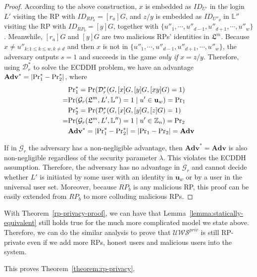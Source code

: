 \begin{proof}
  According to the above construction, %
  $x$ is embedded as $ID_{U'}$ in the login $L'$ visiting the RP with $ID_{RP_{a}} = [r_{a}]G$,
  and $z/y$ is embedded as $ID_{U''_d}$ in $\mathbb{L}''$ visiting the RP with $ID_{RP_{b}}=[y]G$,
  together with $\{u''_1, \cdots, u''_{d-1}, u''_{d+1}, \cdots, u''_w\}$.
  Meanwhile, $[r_{a}]G$ and $[y]G$ are two malicious RPs' identities in $\mathfrak{L}^m$.
  Because $x \neq u''_{k; 1\leq k \leq w, k \neq d}$ and then $x$ is not in $\{u''_1, \cdots, u''_{d-1}, u''_{d+1}, \cdots, u''_w\}$, the adversary outputs $s=1$ and succeeds in the game \emph{only if} $x = z/y$.
  Therefore, using $\mathcal{D}^*_r$ to solve the ECDDH problem, we have an advantage $\mathbf{Adv}^*=|{\rm Pr}^*_1 - {\rm Pr}^*_2|$, where
  \begin{align*}
  &{\rm Pr}^*_1 =  {\rm Pr}(\mathcal{D}^*_r(G, [x]G, [y]G, [xy]G)=1) \\
  =&{\rm Pr}(\mathcal{G}_r(\mathfrak{L}^m, L', \mathbb{L}'')=1 \; | \; u' \in \mathbf{u}_w) = {\rm Pr}_1 \\
  &{\rm Pr}^*_2= {\rm Pr}(\mathcal{D}^*_r(G, [x]G, [y]G, [z]G)=1) \\
  =&{\rm Pr}(\mathcal{G}_r(\mathfrak{L}^m, L', \mathbb{L}'')=1 \; | \; u' \in \mathbb{Z}_n) = {\rm Pr}_2 \\
  &\mathbf{Adv}^*=|{\rm Pr}^*_1-{\rm Pr}^*_2|=|{\rm Pr}_1-{\rm Pr}_2|={\mathbf{Adv}}
  \end{align*}

  If in $\mathcal{G}_r$ the adversary has a non-negligible advantage, then $\mathbf{Adv}^*={\mathbf{Adv}}$ is also non-negligible regardless of the security parameter $\lambda$. This violates the ECDDH assumption. Therefore, the adversary has no advantage in $\mathcal{G}_r$ and cannot decide whether $L'$ is initiated by some user with an identity in $\mathbf{u}_w$ or by a user in the universal user set.
  Moreover, because $RP_b$ is any malicious RP, this proof can be easily extended from $RP_b$ to more colluding malicious RPs.
  \end{proof}

  With Theorem~\ref{rp-privacy-proof}, we can have that Lemma~\ref{lemma:statically-equivalent} still holds true for the much more complicated model we state above. 
  Therefore, we can do the similar analysis to prove that $\mathcal{U\!W\!S}^{priv}$ is still RP-private even if we add more RPs, honest users and malicious users into the system.
  
  This proves Theorem~\ref{theorem:rp-privacy}.\QED
  

  